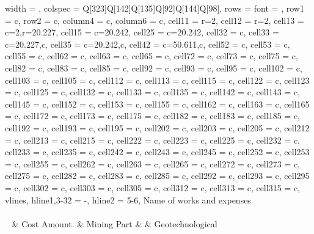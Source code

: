 \begin{longtblr}[
  label = none,
  entry = none,
]{
  width = \linewidth,
  colspec = {Q[323]Q[142]Q[135]Q[92]Q[144]Q[98]},
  rows = {font = \footnotesize},
  row{1} = {c},
  row{2} = {c},
  column{4} = {c},
  column{6} = {c},
  cell{1}{1} = {r=2}{},
  cell{1}{2} = {r=2}{},
  cell{1}{3} = {c=2,r=2}{0.227\linewidth},
  cell{1}{5} = {c=2}{0.242\linewidth},
  cell{2}{5} = {c=2}{0.242\linewidth},
  cell{3}{2} = {c},
  cell{3}{3} = {c=2}{0.227\linewidth,c},
  cell{3}{5} = {c=2}{0.242\linewidth,c},
  cell{4}{2} = {c=5}{0.611\linewidth,c},
  cell{5}{2} = {c},
  cell{5}{3} = {c},
  cell{5}{5} = {c},
  cell{6}{2} = {c},
  cell{6}{3} = {c},
  cell{6}{5} = {c},
  cell{7}{2} = {c},
  cell{7}{3} = {c},
  cell{7}{5} = {c},
  cell{8}{2} = {c},
  cell{8}{3} = {c},
  cell{8}{5} = {c},
  cell{9}{2} = {c},
  cell{9}{3} = {c},
  cell{9}{5} = {c},
  cell{10}{2} = {c},
  cell{10}{3} = {c},
  cell{10}{5} = {c},
  cell{11}{2} = {c},
  cell{11}{3} = {c},
  cell{11}{5} = {c},
  cell{12}{2} = {c},
  cell{12}{3} = {c},
  cell{12}{5} = {c},
  cell{13}{2} = {c},
  cell{13}{3} = {c},
  cell{13}{5} = {c},
  cell{14}{2} = {c},
  cell{14}{3} = {c},
  cell{14}{5} = {c},
  cell{15}{2} = {c},
  cell{15}{3} = {c},
  cell{15}{5} = {c},
  cell{16}{2} = {c},
  cell{16}{3} = {c},
  cell{16}{5} = {c},
  cell{17}{2} = {c},
  cell{17}{3} = {c},
  cell{17}{5} = {c},
  cell{18}{2} = {c},
  cell{18}{3} = {c},
  cell{18}{5} = {c},
  cell{19}{2} = {c},
  cell{19}{3} = {c},
  cell{19}{5} = {c},
  cell{20}{2} = {c},
  cell{20}{3} = {c},
  cell{20}{5} = {c},
  cell{21}{2} = {c},
  cell{21}{3} = {c},
  cell{21}{5} = {c},
  cell{22}{2} = {c},
  cell{22}{3} = {c},
  cell{22}{5} = {c},
  cell{23}{2} = {c},
  cell{23}{3} = {c},
  cell{23}{5} = {c},
  cell{24}{2} = {c},
  cell{24}{3} = {c},
  cell{24}{5} = {c},
  cell{25}{2} = {c},
  cell{25}{3} = {c},
  cell{25}{5} = {c},
  cell{26}{2} = {c},
  cell{26}{3} = {c},
  cell{26}{5} = {c},
  cell{27}{2} = {c},
  cell{27}{3} = {c},
  cell{27}{5} = {c},
  cell{28}{2} = {c},
  cell{28}{3} = {c},
  cell{28}{5} = {c},
  cell{29}{2} = {c},
  cell{29}{3} = {c},
  cell{29}{5} = {c},
  cell{30}{2} = {c},
  cell{30}{3} = {c},
  cell{30}{5} = {c},
  cell{31}{2} = {c},
  cell{31}{3} = {c},
  cell{31}{5} = {c},
  vlines,
  hline{1,3-32} = {-}{},
  hline{2} = {5-6}{},
}
{
			Name
			of works and expenses
			\\~\\~} & Cost
			Amount. & Mining
			Part &  & Geotechnological

\end{longtblr}
